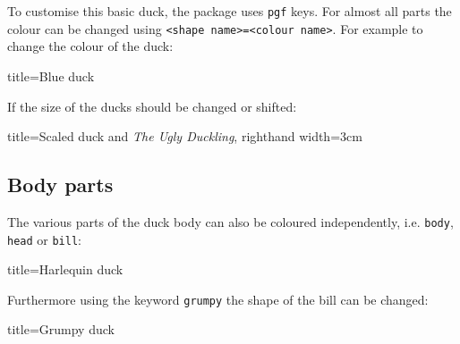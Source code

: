 \documentclass[parskip=half]{scrartcl}
\begin{document}
To customise this basic duck, the package uses \lstinline|pgf| keys. For almost all parts the colour can be changed using \lstinline|<shape name>=<colour name>|. For example to change the colour of the duck:
\begin{tcblisting}{title={Blue duck}}
\begin{tikzpicture}
	\duck[body=blue]
\end{tikzpicture}
\end{tcblisting}

\clearpage
If the size of the ducks should be changed or shifted:
\begin{tcblisting}{title={Scaled duck and \emph{The Ugly Duckling}},	righthand width=3cm}
\begin{tikzpicture}[scale=0.6]
	\duck
	\begin{scope}[xshift=90pt, scale=.3, yshift=150pt]
		\duck
	\end{scope}
	\begin{scope}[xshift=60pt, scale=.3, yshift=100pt]
		\duck
	\end{scope}
	\begin{scope}[xshift=80pt, scale=.3, yshift=50pt]
		\duck[body=gray!50!white,head=gray!50!white]
	\end{scope}		
\end{tikzpicture}
\end{tcblisting}

\subsection{Body parts}

The various parts of the duck body can also be coloured independently, i.e. \lstinline|body|, \lstinline|head| or \lstinline|bill|:

\begin{tcblisting}{title={Harlequin duck}}
\begin{tikzpicture}
	\duck[body=yellow,
		head=yellow!50!orange, 
		bill=red,
		eye=green]
\end{tikzpicture}
\end{tcblisting}

Furthermore using the keyword \lstinline|grumpy| the shape of the bill can be changed:

\begin{tcblisting}{title={Grumpy duck}}
\begin{tikzpicture}
	\duck[grumpy]
\end{tikzpicture}
\begin{tikzpicture}
	\duck[grumpy, bill=cyan]
\end{tikzpicture}
\end{tcblisting}
\end{document}
